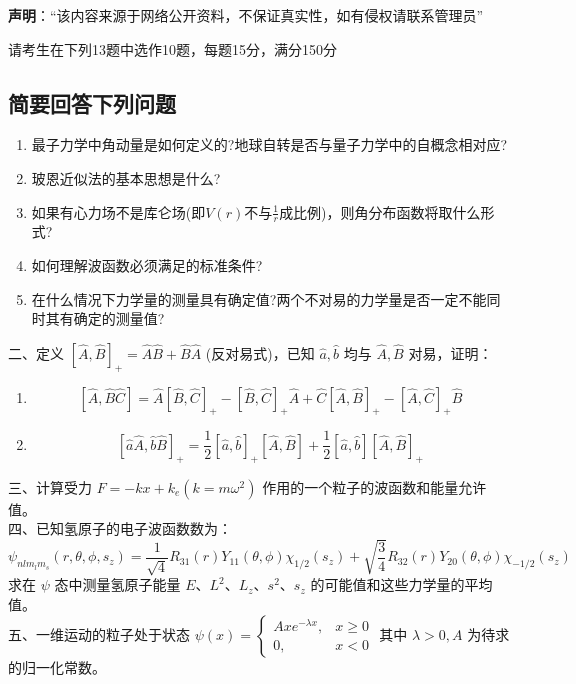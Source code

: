 
\textbf{声明}：“该内容来源于网络公开资料，不保证真实性，如有侵权请联系管理员”

请考生在下列13题中选作10题，每题15分，满分150分
\subsection{简要回答下列问题}
\begin{enumerate}
\item 最子力学中角动量是如何定义的?地球自转是否与量子力学中的自概念相对应?
\item 玻恩近似法的基本思想是什么?
\item 如果有心力场不是库仑场(即$V(r)$不与$\frac{1}{r}$成比例)，则角分布函数将取什么形式?
\item 如何理解波函数必须满足的标准条件?
\item 在什么情况下力学量的测量具有确定值?两个不对易的力学量是否一定不能同时其有确定的测量值?
\end{enumerate}
二、定义 $[\hat{A}, \hat{B}]_{+} = \hat{A}\hat{B} + \hat{B}\hat{A}$ (反对易式)，已知 $\hat{a}, \hat{b}$ 均与 $\hat{A}, \hat{B}$ 对易，证明：

\begin{enumerate}
    \item 
    \[
    [\hat{A}, \hat{B}\hat{C}] = \hat{A}[\hat{B}, \hat{C}]_{+} - [\hat{B}, \hat{C}]_{+}\hat{A} + \hat{C}[\hat{A}, \hat{B}]_{+} - [\hat{A}, \hat{C}]_{+}\hat{B}~
    \]
    \item 
    \[
    [\hat{a}\hat{A}, \hat{b}\hat{B}]_{+} = \frac{1}{2}[\hat{a}, \hat{b}]_{+}[\hat{A}, \hat{B}] + \frac{1}{2}[\hat{a}, \hat{b}][\hat{A}, \hat{B}]_{+}~
    \]
\end{enumerate}
三、计算受力 $F = -kx + k_e (k = m\omega^2)$ 作用的一个粒子的波函数和能量允许值。\\
四、已知氢原子的电子波函数数为：
\[
\psi_{n l m_l m_s}(r,\theta,\phi,s_z) = \frac{1}{\sqrt{4}} R_{31}(r) Y_{11}(\theta, \phi)\chi_{1/2}(s_z) + \sqrt{\frac{3}{4}} R_{32}(r) Y_{20}(\theta, \phi)\chi_{-1/2}(s_z)~
\]
求在 $\psi$ 态中测量氢原子能量 $E$、$L^2$、$L_z$、$s^2$、$s_z$ 的可能值和这些力学量的平均值。\\
五、一维运动的粒子处于状态 $\psi(x) = 
\begin{cases} 
    Axe^{-\lambda x}, & x \geq 0 \\
    0, & x < 0 
\end{cases}
$ 其中 $\lambda > 0, A$ 为待求的归一化常数。

